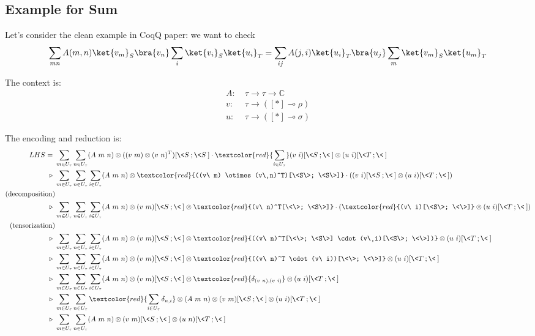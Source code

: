\subsection{Example for Sum}
Let's consider the clean example in CoqQ paper: we want to check
$$
\sum_{mn}A(m,n)\ket{v_m}_S\bra{v_n}\sum_i\ket{v_i}_S\ket{u_i}_T
= \sum_{ij}A(j, i) \ket{u_i}_T\bra{u_j}\sum_m\ket{v_m}_S\ket{u_m}_T
$$

The context is:
\begin{align*}
  A :\ & \tau \to \tau \to \mathbb{C}\\
  v :\ & \tau \to ([*] \multimap \rho)\\
  u :\ & \tau \to ([*] \multimap \sigma)
\end{align*}

The encoding and reduction is:
\begin{align*}
  LHS =\ & \sum_{m \in U_\tau} \sum_{n \in U_\tau} (A\ m\ n) \otimes ((v\ m) \otimes (v\ n)^T)[\<S\>; \<S\>] \cdot \textcolor{red}{\sum_{i \in U_\tau}} (v\ i)[\<S\>; \<\>] \otimes (u\ i)[\<T\>; \<\>] \\
  \triangleright\ & \sum_{m \in U_\tau} \sum_{n \in U_\tau}\sum_{i \in U_\tau} (A\ m\ n) \otimes \textcolor{red}{((v\ m) \otimes (v\ n)^T)[\<S\>; \<S\>]} \cdot \left ( (v\ i)[\<S\>; \<\>] \otimes (u\ i)[\<T\>; \<\>] \right ) \\
   \text{(decomposition)} &\\
  \triangleright\ & \sum_{m \in U_\tau} \sum_{n \in U_\tau} \sum_{i \in U_\tau} (A\ m\ n) \otimes (v\ m)[\<S\>; \<\>] \otimes \textcolor{red}{(v\ n)^T[\<\>; \<S\>]} \cdot ( \textcolor{red}{(v\ i)[\<S\>; \<\>]} \otimes (u\ i)[\<T\>; \<\>]) \\
  \text{(tensorization)} &\\
  \triangleright\ & \sum_{m \in U_\tau} \sum_{n \in U_\tau} \sum_{i \in U_\tau} (A\ m\ n) \otimes (v\ m)[\<S\>; \<\>] \otimes \textcolor{red}{((v\ n)^T[\<\>; \<S\>] \cdot (v\ i)[\<S\>; \<\>])} \otimes (u\ i)[\<T\>; \<\>] \\
  \triangleright\ & \sum_{m \in U_\tau} \sum_{n \in U_\tau} \sum_{i \in U_\tau} (A\ m\ n) \otimes (v\ m)[\<S\>; \<\>] \otimes \textcolor{red}{((v\ n)^T \cdot (v\ i))[\<\>; \<\>]} \otimes (u\ i)[\<T\>; \<\>] \\
  \triangleright\ & \sum_{m \in U_\tau} \sum_{n \in U_\tau} \sum_{i \in U_\tau} (A\ m\ n) \otimes (v\ m)[\<S\>; \<\>] \otimes \textcolor{red}{\delta_{(v\ n), (v\ i)}} \otimes (u\ i)[\<T\>; \<\>] \\
  \triangleright\ & \sum_{m \in U_\tau} \sum_{n \in U_\tau} \textcolor{red}{\sum_{i \in U_\tau} \delta_{n, i}} \otimes (A\ m\ n) \otimes (v\ m)[\<S\>; \<\>] \otimes (u\ i)[\<T\>; \<\>] \\
  \triangleright\ & \sum_{m \in U_\tau} \sum_{n \in U_\tau} (A\ m\ n) \otimes (v\ m)[\<S\>; \<\>] \otimes (u\ n)[\<T\>; \<\>]
\end{align*}

